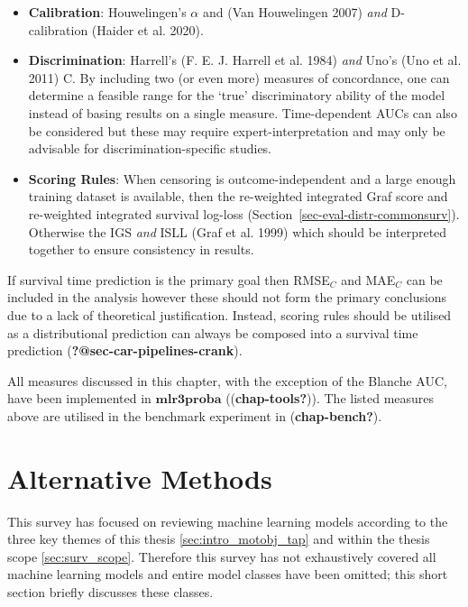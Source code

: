 \documentclass[
  letterpaper,
]{scrbook}
\providecommand{\tightlist}{%
  \setlength{\itemsep}{0pt}\setlength{\parskip}{0pt}}\usepackage{longtable,booktabs,array}
\theoremstyle{plain}
\theoremstyle{definition}
\theoremstyle{remark}
\begin{document}
\begin{itemize}
\tightlist
\item
  \textbf{Calibration}: Houwelingen's \(\alpha\) and (Van Houwelingen
  2007) \emph{and} D-calibration (Haider et al. 2020).
\item
  \textbf{Discrimination}: Harrell's (F. E. J. Harrell et al. 1984)
  \emph{and} Uno's (Uno et al. 2011) C. By including two (or even more)
  measures of concordance, one can determine a feasible range for the
  `true' discriminatory ability of the model instead of basing results
  on a single measure. Time-dependent AUCs can also be considered but
  these may require expert-interpretation and may only be advisable for
  discrimination-specific studies.
\item
  \textbf{Scoring Rules}: When censoring is outcome-independent and a
  large enough training dataset is available, then the re-weighted
  integrated Graf score and re-weighted integrated survival log-loss
  (Section~\ref{sec-eval-distr-commonsurv}). Otherwise the IGS
  \emph{and} ISLL (Graf et al. 1999) which should be interpreted
  together to ensure consistency in results.
\end{itemize}

If survival time prediction is the primary goal then RMSE\(_C\) and
MAE\(_C\) can be included in the analysis however these should not form
the primary conclusions due to a lack of theoretical justification.
Instead, scoring rules should be utilised as a distributional prediction
can always be composed into a survival time prediction
(\textbf{?@sec-car-pipelines-crank}).

All measures discussed in this chapter, with the exception of the
Blanche AUC, have been implemented in \(\textbf{mlr3proba}\)
((\textbf{chap-tools?})). The listed measures above are utilised in the
benchmark experiment in (\textbf{chap-bench?}).


\hypertarget{alternative-methods}{%
\chapter{Alternative Methods}\label{alternative-methods}}

This survey has focused on reviewing machine learning models according
to the three key themes of this thesis \ref{sec:intro_motobj_tap} and
within the thesis scope \ref{sec:surv_scope}. Therefore this survey has
not exhaustively covered all machine learning models and entire model
classes have been omitted; this short section briefly discusses these
classes.
\end{document}
